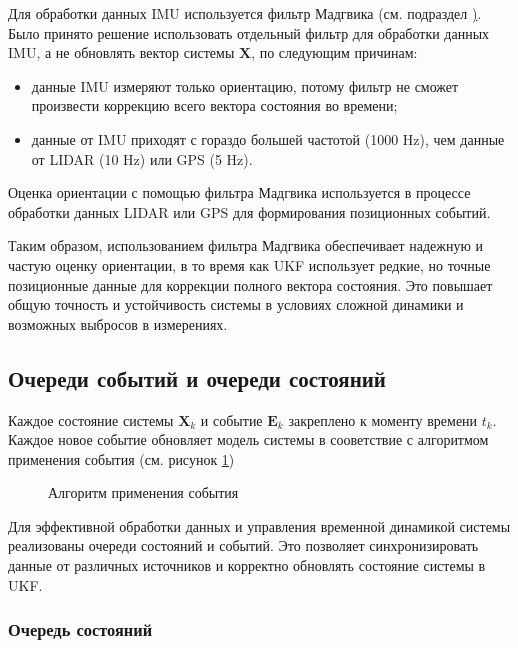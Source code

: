 Для обработки данных IMU используется фильтр Мадгвика (см. подраздел \href{sec:ahrs}). Было принято решение использовать
отдельный фильтр для обработки данных IMU, а не обновлять вектор системы $\mathbf{X}$,
по следующим причинам:
\begin{itemize}
	\item данные IMU измеряют только ориентацию, потому фильтр не сможет произвести коррекцию
	      всего вектора состояния во времени;
        \item данные от IMU приходят с гораздо большей частотой (1000 Hz), чем данные от LIDAR (10 Hz) или GPS (5 Hz).
\end{itemize}

Оценка ориентации с помощью фильтра Мадгвика используется 
в процессе обработки данных LIDAR или GPS для формирования позиционных событий.

Таким образом, использованием фильтра Мадгвика обеспечивает надежную и частую оценку ориентации, в то время как UKF использует редкие, но точные позиционные данные для коррекции полного вектора состояния.
Это повышает общую точность и устойчивость системы в условиях сложной динамики и возможных выбросов в измерениях.


\subsection{Очереди событий и очереди состояний}
\label{subsec:queues}

Каждое состояние системы $\mathbf{X}_k$ и событие $\mathbf{E}_k$ 
закреплено к моменту времени $t_k$. Каждое новое событие 
обновляет модель системы в сооветствие с алгоритмом применения события (см. рисунок \ref{fig:apply_kf_event})
\FloatBarrier
\begin{figure}[H]
\centering
\caption{Алгоритм применения события}
\label{fig:apply_kf_event}
\end{figure}

Для эффективной обработки данных и управления временной динамикой системы реализованы очереди состояний и событий.
Это позволяет синхронизировать данные от различных источников и корректно обновлять состояние системы в UKF.

\subsubsection{Очередь состояний}
\label{subsec:state_queue}
\hfill

